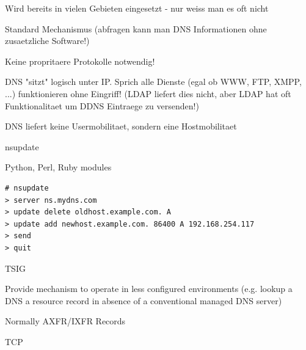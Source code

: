 \documentclass[9pt]{article}
\begin{document}
\begin{slide}
\bi
	\item Wird bereits in vielen Gebieten eingesetzt - nur weiss man es oft nicht
	\item Standard Mechanismus (abfragen kann man DNS Informationen ohne zusaetzliche Software!)
	\item Keine propritaere Protokolle notwendig!
	\item DNS "sitzt" logisch unter IP. Sprich alle Dienste (egal ob WWW, FTP, XMPP, ...) funktionieren ohne Eingriff! (LDAP
	      liefert dies nicht, aber LDAP hat oft Funktionalitaet um DDNS Eintraege zu versenden!)
	\item DNS liefert keine Usermobilitaet, sondern eine Hostmobilitaet
\ei
\end{slide}


\begin{slide}
\bi
	\item nsupdate
	\item Python, Perl, Ruby modules
\begin{verbatim}
# nsupdate
> server ns.mydns.com
> update delete oldhost.example.com. A
> update add newhost.example.com. 86400 A 192.168.254.117
> send
> quit
\end{verbatim}
\ei
\end{slide}


\begin{slide}
\bi
	\item TSIG
\ei
\end{slide}

\begin{slide}
\bi
	\item Provide mechanism to operate in less configured environments (e.g. lookup a DNS a resource record in absence of a
	conventional managed DNS server)
\ei
\end{slide}


\begin{slide}
\bi
	\item Normally AXFR/IXFR Records
	\item TCP
\ei
\end{slide}
\end{document}
